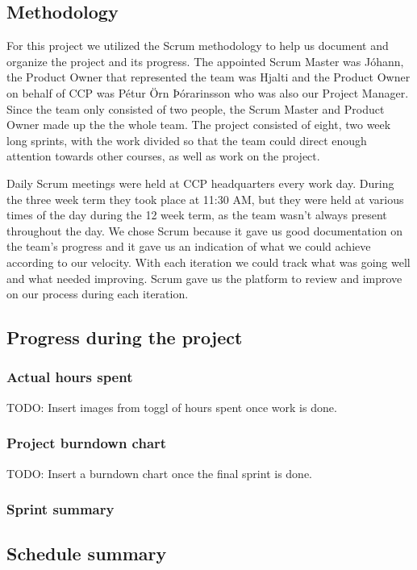 \subsection{Methodology}
For this project we utilized the Scrum methodology to help us document and organize the project and its progress. The appointed Scrum Master was Jóhann, the Product Owner that represented the team was Hjalti and the Product Owner on behalf of CCP was Pétur Örn Þórarinsson who was also our Project Manager. Since the team only consisted of two people, the Scrum Master and Product Owner made up the the whole team. The project consisted of eight, two week long sprints, with the work divided so that the team could direct enough attention towards other courses, as well as work on the project.

Daily Scrum meetings were held at CCP headquarters every work day. During the three week term they took place at 11:30 AM, but they were held at various times of the day during the 12 week term, as the team wasn't always present throughout the day. We chose Scrum because it gave us good documentation on the team's progress and it gave us an indication of what we could achieve according to our velocity. With each iteration we could track what was going well and what needed improving. Scrum gave us the platform to review and improve on our process during each iteration.

\subsection{Progress during the project}

\subsubsection{Actual hours spent}

TODO: Insert images from toggl of hours spent once work is done.

\subsubsection{Project burndown chart}

TODO: Insert a burndown chart once the final sprint is done.

\subsubsection{Sprint summary}

\subsection{Schedule summary}